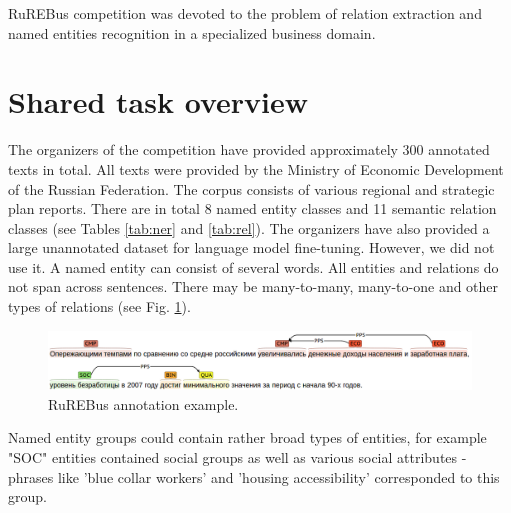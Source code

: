 \documentclass{dialogue}
\begin{document}
RuREBus competition was devoted to the problem of relation extraction and named entities recognition in a specialized business domain.

\section{Shared task overview}
The organizers of the competition have provided approximately 300 annotated texts in total. All texts were provided by the Ministry of Economic Development of the Russian Federation. The corpus consists of various regional and strategic plan reports. There are in total 8 named entity classes and 11 semantic relation classes (see Tables \ref{tab:ner} and \ref{tab:rel}). The organizers have also provided a large unannotated dataset for language model fine-tuning. However, we did not use it. A named entity can consist of several words. All entities and relations do not span across sentences. There may be many-to-many, many-to-one and other types of relations (see Fig. \ref{fig:brat}).

\begin{figure}[thb]
	\centering
	\includegraphics[scale=0.4]{pics/brat}
	\caption{RuREBus annotation example.}
	\label{fig:brat}
\end{figure}

 
Named entity groups could contain rather broad types of entities, for example "SOC" entities contained social groups as well as various social attributes - phrases like 'blue collar workers' and 'housing accessibility' corresponded to this group.
\end{document}

